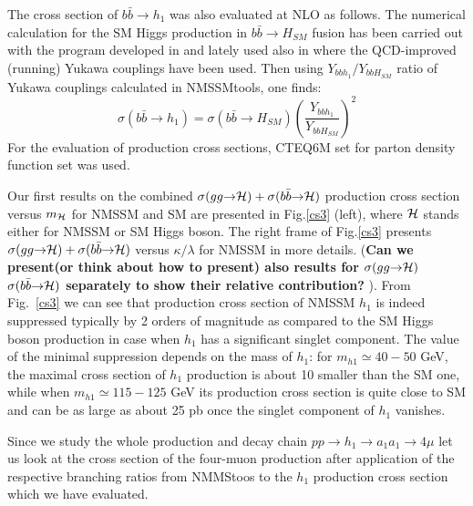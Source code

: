 \documentclass[aps,12pt,superscriptaddress,nofootinbib,floatfix,showpacs]{revtex4}
\begin{document}
The cross section of $b\bar{b}\to h_1$ was also evaluated at
NLO as follows. The numerical calculation for the  SM Higgs
production in  $b\bar{b}\to H_{SM}$ fusion has been carried out
with the program developed in \cite{Balazs:1998sb} and lately
used also in \cite{Belyaev:2005nu} where the QCD-improved
(running) Yukawa couplings have been used. Then using
$Y_{bbh_1}/Y_{bbH_{SM}}$ ratio of  Yukawa couplings 
calculated  in NMSSMtools, one finds:
\begin{equation}
\sigma(b\bar{b}\to h_1)=\sigma(b\bar{b}\to H_{SM})
\left(\frac{Y_{bbh_1}}{Y_{bbH_{SM}}}\right)^2
\end{equation}
For the evaluation of production cross sections, CTEQ6M set for
parton density function set was used. 

Our first results  on the
combined  $\sigma(gg\to {\cal H}) + \sigma(b\bar{b}\to {\cal
H})$ production cross section versus $m_{\cal H}$ for NMSSM and
SM  are presented in Fig.\ref{cs3} (left), where ${\cal H}$ stands
either for NMSSM or SM Higgs boson. 
The right frame of Fig.\ref{cs3} 
presents $\sigma(gg\to {\cal H}) + \sigma(b\bar{b}\to {\cal
H})$ versus $\kappa/\lambda$ for NMSSM in more details. 
({\bf Can we present(or
think about how to present) also results for $\sigma(gg\to
{\cal H})$ $\sigma(b\bar{b}\to {\cal H})$ separately to show
their relative contribution? }).
From Fig.~\ref{cs3} we can see that 
production cross section of NMSSM $h_1$ is indeed
suppressed typically by 2 orders of magnitude as compared to the
SM Higgs boson production in case when 
$h_1$ has a significant singlet component. The value of the
minimal suppression depends on the mass of $h_1$:
for $m_{h1}\simeq 40-50$ GeV, the maximal cross section of $h_1$
production is about 10 smaller than the SM one, while
when  $m_{h1}\simeq 115-125$ GeV its production cross section
is quite close to SM and can be as large as about 25 pb 
once the singlet component of $h_1$
vanishes.

Since we study the whole production and decay chain
$pp\to h_1 \to a_1 a_1\to 4\mu$ let us  look at the
cross section of the four-muon production after application
of the respective branching ratios from NMMStoos
to the $h_1$ production cross section which we have evaluated.
\end{document}
